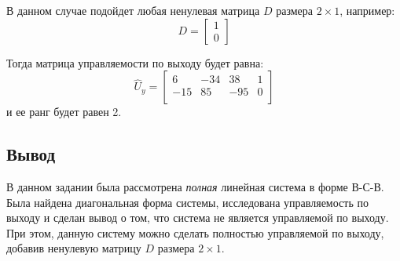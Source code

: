 В данном случае подойдет любая ненулевая матрица $D$ размера $2\times 1$, например: 
\begin{equation}
    D = \begin{bmatrix}
        1 \\
        0 
    \end{bmatrix}
\end{equation}

Тогда матрица управляемости по выходу будет равна:
\begin{equation}
    \hat{U}_y = \begin{bmatrix}
        6  & -34  & 38  & 1 \\ 
        -15  & 85  & -95  & 0 \\ 
        \end{bmatrix}
\end{equation}
и ее ранг будет равен 2.

\subsection{Вывод}
В данном задании была рассмотрена \textit{полная} линейная система 
в форме В-С-В. Была найдена диагональная форма системы, исследована управляемость
по выходу и сделан вывод о том, что система не является управляемой по выходу. 
При этом, данную систему можно сделать полностью управляемой по выходу, добавив
ненулевую матрицу $D$ размера $2\times 1$. 